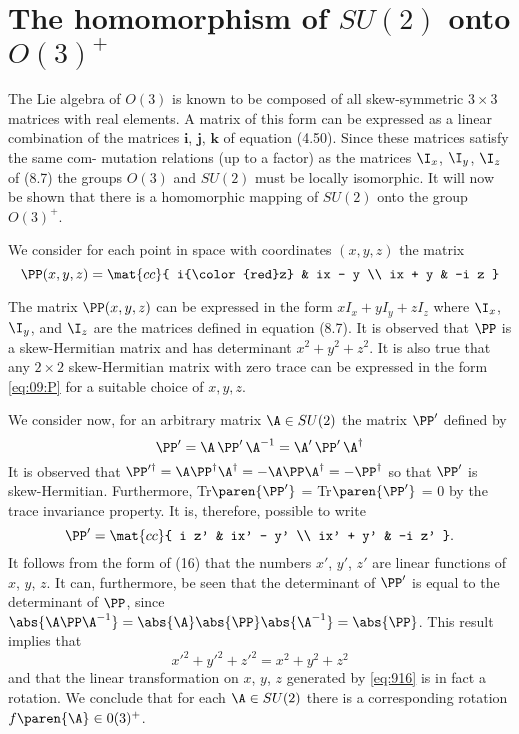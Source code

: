 \section{The homomorphism of $SU(2)$ onto $O(3)^{+}$}

The Lie algebra of $O(3)$ is known to be composed of all skew-symmetric $3 \times 3$ matrices with real elements. A matrix of this form can be expressed as a linear combination of the matrices $\mathbf{i}$, $\mathbf{j}$, $\mathbf{k}$ of equation (4.50). Since these matrices satisfy the same com- mutation relations (up to a factor) as the matrices $\I_{x}$, $\I_{y}$, $\I_{z}$ of (8.7) the groups $O(3)$ and $SU(2)$ must be locally isomorphic. It will now be shown that there is a homomorphic mapping of $SU(2)$ onto the group $O(3)^{+}$.

We consider for each point in space with coordinates $(x, y, z)$ the matrix
\begin{equation}
  \PP(x, y, z) = \mat{cc}{
  i{\color{red}z} & ix - y \\
  ix + y & -i z }
  \label{eq:09:P}
\end{equation}

The matrix $\PP(x, y, z)$ can be expressed in the form $xI_{x} + yI_{y} + zI_{z}$ where $\I_{x}$, $\I_{y}$, and $\I_{z}$ are the matrices defined in equation (8.7). It is observed that $\PP$ is a skew-Hermitian matrix and has determinant $x^{2} + y^{2} + z^{2}$. It is also true that any $2 \times 2$ skew-Hermitian matrix with zero trace can be expressed in the form \eqref{eq:09:P} for a suitable choice of $x, y, z.$

We consider now, for an arbitrary matrix $\A \in SU(2)$ the matrix $\PP'$ defined by
\begin{equation}
  \PP' = \A\, \PP'\, \A^{-1} = \A' \, \PP' \, \A^{\dagger}
  \label{eq:916}
\end{equation}
It is observed that $\PP'^{\dagger} = \A \PP^{\dagger} \A^{\dagger} = -\A \PP \A^{\dagger} = - \PP^{\dagger}$ so that $\PP'$ is skew-Hermitian.	Furthermore, Tr$\paren{\PP'}$ = Tr$\paren{\PP'}$ = 0 by the trace invariance property. It is, therefore, possible to write
\begin{equation}
  \PP' = \mat{cc}{
  i z' & ix' - y' \\
  ix' + y' & -i z' } .
  \label{eq:09:P'}
\end{equation}
It follows from the form of (16) that the numbers $x'$, $y'$, $z'$ are linear functions of $x$, $y$, $z$. It can, furthermore, be seen that the determinant of $\PP'$ is equal to the determinant of $\PP$, since $\abs{\A\PP\A^{-1}} = \abs{\A} \abs{\PP} \abs{\A^{-1}} = \abs{\PP}$. This result implies that
\begin{equation}
  x'^{2} + y'^{2} + z'^{2} = x^{2} + y^{2} + z^{2}
\end{equation}
and that the linear transformation on $x$, $y$, $z$ generated by \eqref{eq:916} is in fact a rotation. We conclude that for each $\A \in SU(2)$ there is a corresponding rotation $f\paren{\A} \in 0(3)^{+}$.

